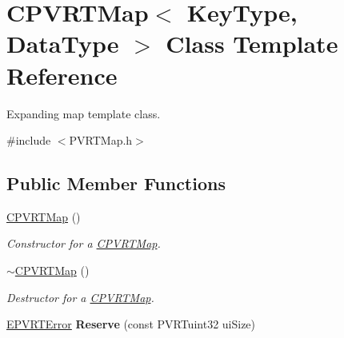 \hypertarget{singleton_c_p_v_r_t_map}{\section{C\+P\+V\+R\+T\+Map$<$ Key\+Type, Data\+Type $>$ Class Template Reference}
\label{singleton_c_p_v_r_t_map}
}


Expanding map template class.  




{\ttfamily \#include $<$P\+V\+R\+T\+Map.\+h$>$}

\subsection*{Public Member Functions}
\begin{DoxyCompactItemize}
\item 
\hyperlink{singleton_c_p_v_r_t_map_ad53989a872840120753ad604c9e64b7d}{C\+P\+V\+R\+T\+Map} ()
\begin{DoxyCompactList}\small\item\em Constructor for a \hyperlink{singleton_c_p_v_r_t_map}{C\+P\+V\+R\+T\+Map}. \end{DoxyCompactList}\item 
\hyperlink{singleton_c_p_v_r_t_map_a938e051ed468becf337bf1fb51c1d873}{$\sim$\+C\+P\+V\+R\+T\+Map} ()
\begin{DoxyCompactList}\small\item\em Destructor for a \hyperlink{singleton_c_p_v_r_t_map}{C\+P\+V\+R\+T\+Map}. \end{DoxyCompactList}\item 
\hypertarget{singleton_c_p_v_r_t_map_a049c627938bcc677a6ca7acabe5d396f}{\hyperlink{_p_v_r_t_error_8h_a9e837ff1a83f3a5f332bc4cc78454608}{E\+P\+V\+R\+T\+Error} {\bfseries Reserve} (const P\+V\+R\+Tuint32 ui\+Size)}\label{singleton_c_p_v_r_t_map_a049c627938bcc677a6ca7acabe5d396f}


\end{DoxyCompactItemize}
